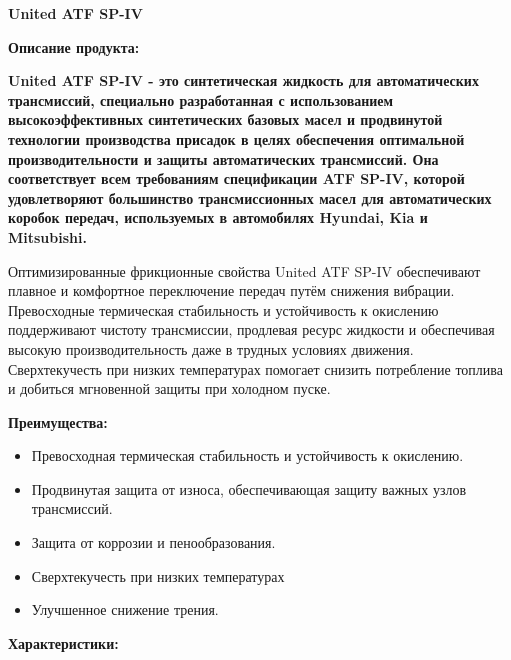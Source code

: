 \documentclass[12pt,a4paper]{article}
\begin{document}
\begin{spacing}{2.5}
{\textbf{\fontsize{20pt}{30pt}\selectfont United ATF SP-IV}}
\end{spacing}

\begin{spacing}{2.5}
{\textbf{\fontsize{14pt}{4pt}\selectfont Описание продукта:}}
\end{spacing}

{\textbf{United ATF SP-IV - это синтетическая жидкость для автоматических трансмиссий, специально разработанная с использованием высокоэффективных синтетических базовых масел и продвинутой технологии производства присадок в целях обеспечения оптимальной производительности и защиты автоматических трансмиссий. Она соответствует всем требованиям спецификации ATF SP-IV, которой удовлетворяют большинство трансмиссионных масел для автоматических коробок передач, используемых в автомобилях Hyundai, Kia и Mitsubishi.}}

Оптимизированные фрикционные свойства United ATF SP-IV обеспечивают плавное и комфортное переключение передач путём снижения вибрации. Превосходные термическая стабильность и устойчивость к окислению поддерживают чистоту трансмиссии, продлевая ресурс жидкости и обеспечивая высокую производительность даже в трудных условиях движения. Сверхтекучесть при низких температурах помогает снизить потребление топлива и добиться мгновенной защиты при холодном пуске.

\bigskip
{\textbf{\fontsize{14pt}{10pt}\selectfont Преимущества:}}

\begin{itemize}[itemsep=1.4pt]

\item  Превосходная термическая стабильность и устойчивость к окислению.
\item  Продвинутая защита от износа, обеспечивающая защиту важных узлов трансмиссий.
\item  Защита от коррозии и пенообразования.
\item  Сверхтекучесть при низких температурах
\item  Улучшенное снижение трения.
 
\end{itemize}

\begin{spacing}{1}
{\textbf{\fontsize{14pt}{4pt}\selectfont Характеристики:}}
\end{spacing}
\end{document}

